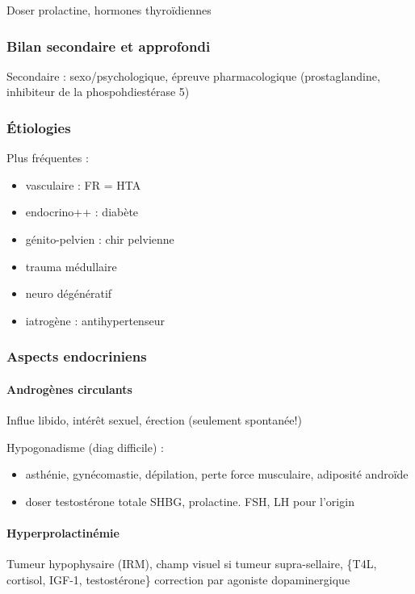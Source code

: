 \documentclass[11pt]{article}
\begin{document}
Doser prolactine, hormones thyroïdiennes

\subsubsection{Bilan secondaire et approfondi}
\label{sec:org012a58c}
Secondaire : sexo/psychologique, épreuve pharmacologique (prostaglandine,
inhibiteur de la phospohdiestérase 5)

\subsubsection{Étiologies}
\label{sec:orgefbf669}
Plus fréquentes :
\begin{itemize}
\item vasculaire : FR = HTA
\item endocrino++ : diabète
\item génito-pelvien : chir pelvienne
\item trauma médullaire
\item neuro dégénératif
\item iatrogène : antihypertenseur
\end{itemize}

\subsubsection{Aspects endocriniens}
\label{sec:org28260d6}
\paragraph{Androgènes circulants}
\label{sec:org3a6f32e}
Influe libido, intérêt sexuel, érection (seulement spontanée!)

Hypogonadisme (diag difficile) : 
\begin{itemize}
\item asthénie, gynécomastie, dépilation, perte force musculaire, adiposité androïde
\item doser testostérone totale \textpm{} SHBG, prolactine. FSH, LH pour l'origin
\end{itemize}

\paragraph{Hyperprolactinémie}
\label{sec:orga8966a5}
Tumeur hypophysaire (IRM), champ visuel si tumeur
supra-sellaire, \{T4L, cortisol, IGF-1, testostérone\}
\thus correction par agoniste dopaminergique
\end{document}
